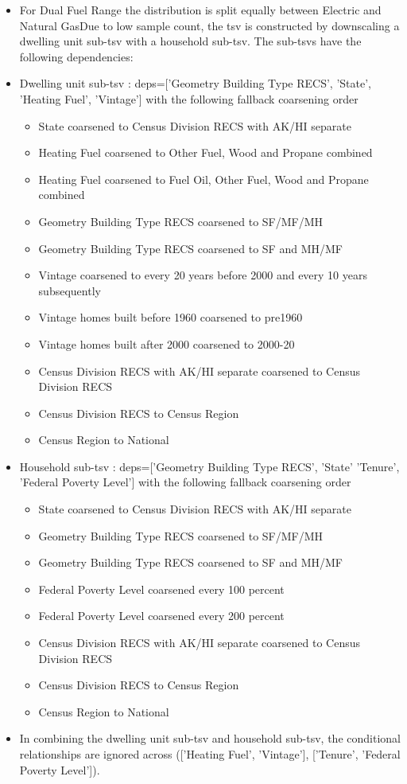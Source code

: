 \begin{itemize}
\item For Dual Fuel Range the distribution is split equally between Electric and Natural GasDue to low sample count, the tsv is constructed by downscaling a dwelling unit sub-tsv with a household sub-tsv. The sub-tsvs have the following dependencies:
\item Dwelling unit sub-tsv : deps=['Geometry Building Type RECS', 'State', 'Heating Fuel', 'Vintage'] with the following fallback coarsening order
  \begin{itemize}
  \item State coarsened to Census Division RECS with AK/HI separate
  \item Heating Fuel coarsened to Other Fuel, Wood and Propane combined
  \item Heating Fuel coarsened to Fuel Oil, Other Fuel, Wood and Propane combined
  \item Geometry Building Type RECS coarsened to SF/MF/MH
  \item Geometry Building Type RECS coarsened to SF and MH/MF
  \item Vintage coarsened to every 20 years before 2000 and every 10 years subsequently
  \item Vintage homes built before 1960 coarsened to pre1960
  \item Vintage homes built after 2000 coarsened to 2000-20
  \item Census Division RECS with AK/HI separate coarsened to Census Division RECS
  \item Census Division RECS to Census Region
  \item Census Region to National
  \end{itemize}
\item Household sub-tsv : deps=['Geometry Building Type RECS', 'State' 'Tenure', 'Federal Poverty Level'] with the following fallback coarsening order
  \begin{itemize}
  \item State coarsened to Census Division RECS with AK/HI separate
  \item Geometry Building Type RECS coarsened to SF/MF/MH
  \item Geometry Building Type RECS coarsened to SF and MH/MF
  \item Federal Poverty Level coarsened every 100 percent
  \item Federal Poverty Level coarsened every 200 percent
  \item Census Division RECS with AK/HI separate coarsened to Census Division RECS
  \item Census Division RECS to Census Region
  \item Census Region to National
  \end{itemize}
\item In combining the dwelling unit sub-tsv and household sub-tsv, the conditional relationships are ignored across (['Heating Fuel', 'Vintage'], ['Tenure', 'Federal Poverty Level']).
\end{itemize}
